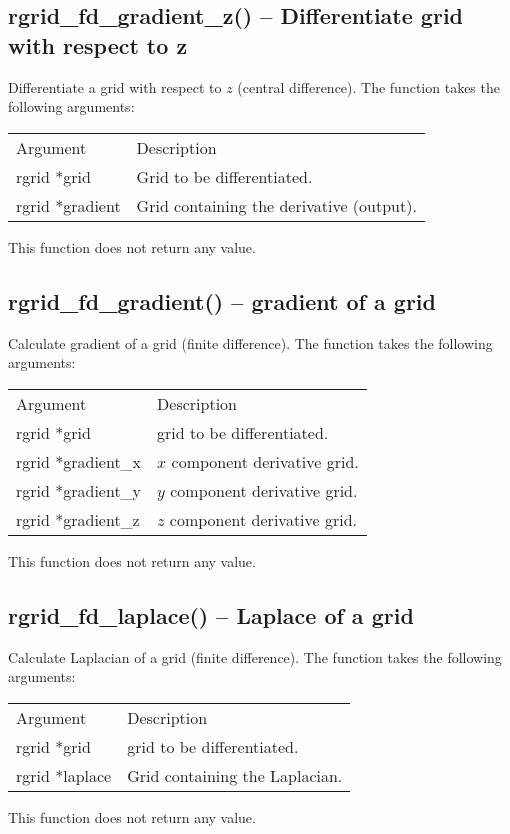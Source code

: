 \documentclass[12pt,letterpaper]{report}
\begin{document}
\subsection{rgrid\_fd\_gradient\_z() -- Differentiate grid with respect to z}

Differentiate a grid with respect to $z$ (central difference). The function takes the following arguments:
\begin{longtable}{p{} p{}}
Argument & Description\\
\cline{1-2}
rgrid *grid & Grid to be differentiated.\\
rgrid *gradient & Grid containing the derivative (output).\\
\end{longtable}
\noindent
This function does not return any value.

\subsection{rgrid\_fd\_gradient() -- gradient of a grid}

Calculate gradient of a grid (finite difference). The function takes the following arguments:
\begin{longtable}{p{} p{}}
Argument & Description\\
\cline{1-2}
rgrid *grid & grid to be differentiated.\\
rgrid *gradient\_x & $x$ component derivative grid.\\
rgrid *gradient\_y & $y$ component derivative grid.\\
rgrid *gradient\_z & $z$ component derivative grid.\\
\end{longtable}
\noindent
This function does not return any value.

\subsection{rgrid\_fd\_laplace() -- Laplace of a grid}

Calculate Laplacian of a grid (finite difference). The function takes the following arguments:
\begin{longtable}{p{} p{}}
Argument & Description\\
\cline{1-2}
rgrid *grid & grid to be differentiated.\\
rgrid *laplace & Grid containing the Laplacian.\\
\end{longtable}
\noindent
This function does not return any value.
\end{document}
